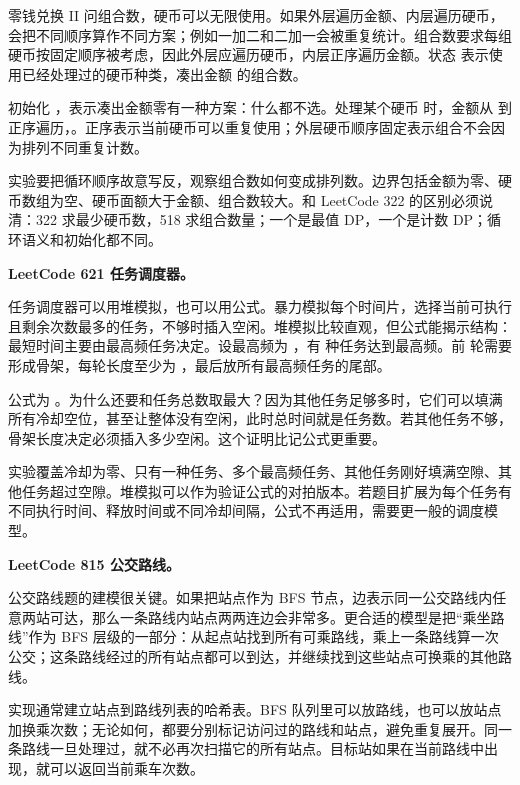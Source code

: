 零钱兑换 II 问组合数，硬币可以无限使用。如果外层遍历金额、内层遍历硬币，会把不同顺序算作不同方案；例如一加二和二加一会被重复统计。组合数要求每组硬币按固定顺序被考虑，因此外层应遍历硬币，内层正序遍历金额。状态  表示使用已经处理过的硬币种类，凑出金额  的组合数。

初始化 ，表示凑出金额零有一种方案：什么都不选。处理某个硬币  时，金额从  到  正序遍历，。正序表示当前硬币可以重复使用；外层硬币顺序固定表示组合不会因为排列不同重复计数。

实验要把循环顺序故意写反，观察组合数如何变成排列数。边界包括金额为零、硬币数组为空、硬币面额大于金额、组合数较大。和 LeetCode 322 的区别必须说清：322 求最少硬币数，518 求组合数量；一个是最值 DP，一个是计数 DP；循环语义和初始化都不同。

\noindent\textbf{LeetCode 621 任务调度器。}

任务调度器可以用堆模拟，也可以用公式。暴力模拟每个时间片，选择当前可执行且剩余次数最多的任务，不够时插入空闲。堆模拟比较直观，但公式能揭示结构：最短时间主要由最高频任务决定。设最高频为 ，有  种任务达到最高频。前  轮需要形成骨架，每轮长度至少为 ，最后放所有最高频任务的尾部。

公式为 。为什么还要和任务总数取最大？因为其他任务足够多时，它们可以填满所有冷却空位，甚至让整体没有空闲，此时总时间就是任务数。若其他任务不够，骨架长度决定必须插入多少空闲。这个证明比记公式更重要。

实验覆盖冷却为零、只有一种任务、多个最高频任务、其他任务刚好填满空隙、其他任务超过空隙。堆模拟可以作为验证公式的对拍版本。若题目扩展为每个任务有不同执行时间、释放时间或不同冷却间隔，公式不再适用，需要更一般的调度模型。

\noindent\textbf{LeetCode 815 公交路线。}

公交路线题的建模很关键。如果把站点作为 BFS 节点，边表示同一公交路线内任意两站可达，那么一条路线内站点两两连边会非常多。更合适的模型是把“乘坐路线”作为 BFS 层级的一部分：从起点站找到所有可乘路线，乘上一条路线算一次公交；这条路线经过的所有站点都可以到达，并继续找到这些站点可换乘的其他路线。

实现通常建立站点到路线列表的哈希表。BFS 队列里可以放路线，也可以放站点加换乘次数；无论如何，都要分别标记访问过的路线和站点，避免重复展开。同一条路线一旦处理过，就不必再次扫描它的所有站点。目标站如果在当前路线中出现，就可以返回当前乘车次数。

